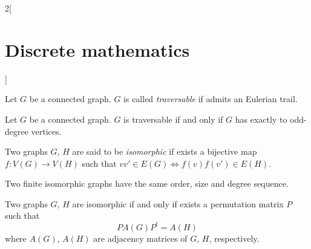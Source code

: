 \documentclass[../../../main.tex]{subfiles}
\begin{document}
\begin{multicols}{2}[\section{Discrete mathematics}]
\begin{definition}
Let $G$ be a connected graph. $G$ is called \textit{traversable} if admits an Eulerian trail.
\end{definition}
\begin{theorem}
Let $G$ be a connected graph. $G$ is traversable if and only if $G$ has exactly to odd-degree vertices.
\end{theorem}
\begin{definition}
Two graphs $G$, $H$ are said to be \textit{isomorphic} if exists a bijective map $f:V(G)\rightarrow V(H)$ such that $vv'\in E(G)\iff f(v)f(v')\in E(H)$.
\end{definition}
\begin{prop}
Two finite isomorphic graphs have the same order, size and degree sequence.
\end{prop}
\begin{theorem}
Two graphs $G$, $H$ are isomorphic if and only if exists a permutation matrix $P$ such that $$PA(G)P^t=A(H)$$ where $A(G)$, $A(H)$ are adjacency matrices of $G$, $H$, respectively.
\end{theorem}

\end{multicols}
\end{document}
